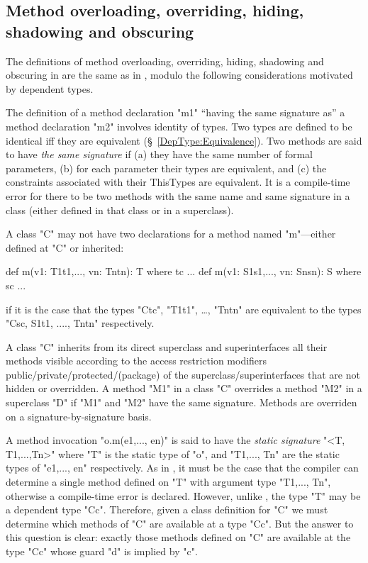 \subsection{Method overloading, overriding, hiding, shadowing and obscuring}

The definitions of method overloading, overriding, hiding, shadowing
and obscuring in \Xten{} are the same as in \Java, modulo the following
considerations motivated by dependent types.

The definition of a method declaration \xcd"m1" ``having the same signature
as'' a method declaration \xcd"m2" involves identity of types. Two \Xten{} types
are defined to be identical iff they are equivalent (\S~\ref{DepType:Equivalence}).
Two methods are said to have {\em the same signature} if (a)
they have the same number of formal parameters, (b) for each parameter
their types are equivalent, and (c) the constraints associated with
their ThisTypes are equivalent. It is a compile-time error for there
to be two methods with the same name and same signature in a class
(either defined in that class or in a superclass).

\begin{staticrule*}
  A class \xcd"C" may not have two declarations for a method named \xcd"m"---either
  defined at \xcd"C" or inherited:
\begin{xten}
def m(v1: T1{t1},..., vn: Tn{tn}): T where tc {...}
def m(v1: S1{s1},..., vn: Sn{sn}): S where sc {...}
\end{xten}
\noindent
if it is the case that the types \xcd"C{tc}", \xcd"T1{t1}",
\dots, \xcd"Tn{tn}" are
equivalent to the types \xcd"C{sc}, S1{t1}, ...., Tn{tn}"
respectively.
\end{staticrule*}

A class \xcd"C" inherits from its direct superclass and superinterfaces all
their methods visible according to the access restriction modifiers
public/private/protected/(package) of the superclass/superinterfaces
that are not hidden or overridden. A method \xcd"M1" in a class \xcd"C" overrides
a method \xcd"M2" in a superclass \xcd"D" if \xcd"M1" and \xcd"M2" have the same signature.
Methods are overriden on a signature-by-signature basis.

A method invocation \xcd"o.m(e1,..., en)" is said to have the {\em static
signature} \xcd"<T, T1,...,Tn>" where \xcd"T" is the static type of \xcd"o", and
\xcd"T1,..., Tn" are the static types of \xcd"e1,..., en" respectively.  As in
\Java, it must be the case that the compiler can determine a single
method defined on \xcd"T" with argument type \xcd"T1,..., Tn", otherwise a
compile-time error is declared. However, unlike \Java, the \Xten{} type \xcd"T"
may be a dependent type \xcd"C{c}". Therefore, given a class definition for
\xcd"C" we must determine which methods of \xcd"C" are available at a type
\xcd"C{c}". But the answer to this question is clear: exactly those methods
defined on \xcd"C" are available at the type \xcd"C{c}"
whose guard \xcd"d" is implied by \xcd"c".


